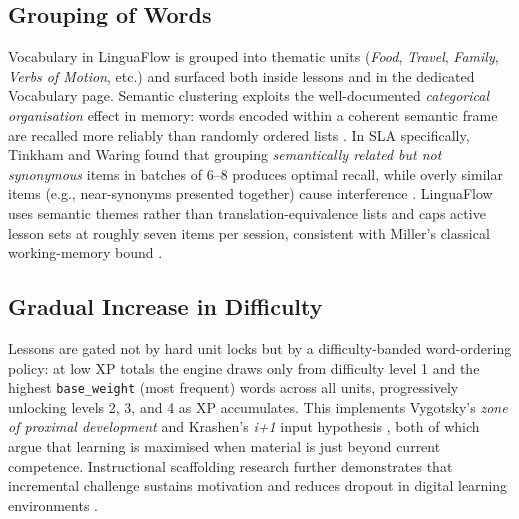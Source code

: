 \documentclass[11pt,a4paper]{article}
\begin{document}
\subsection{Grouping of Words}
Vocabulary in LinguaFlow is grouped into thematic units (\emph{Food}, \emph{Travel}, \emph{Family}, \emph{Verbs of Motion}, etc.) and surfaced both inside lessons and in the dedicated Vocabulary page. Semantic clustering exploits the well-documented \emph{categorical organisation} effect in memory: words encoded within a coherent semantic frame are recalled more reliably than randomly ordered lists \cite{bousfield1953occurrence,tulving1962subjective}. In SLA specifically, Tinkham and Waring found that grouping \emph{semantically related but not synonymous} items in batches of 6--8 produces optimal recall, while overly similar items (e.g., near-synonyms presented together) cause interference \cite{tinkham1997effects,waring1997negative}. LinguaFlow uses semantic themes rather than translation-equivalence lists and caps active lesson sets at roughly seven items per session, consistent with Miller's classical working-memory bound \cite{miller1956magical}.

\subsection{Gradual Increase in Difficulty}
Lessons are gated not by hard unit locks but by a difficulty-banded word-ordering policy: at low XP totals the engine draws only from difficulty level 1 and the highest \texttt{base\_weight} (most frequent) words across all units, progressively unlocking levels 2, 3, and 4 as XP accumulates. This implements Vygotsky's \emph{zone of proximal development} \cite{vygotsky1978mind} and Krashen's \emph{i+1} input hypothesis \cite{krashen1985input}, both of which argue that learning is maximised when material is just beyond current competence. Instructional scaffolding research further demonstrates that incremental challenge sustains motivation and reduces dropout in digital learning environments \cite{wood1976role,vanlehn2011relative}.
\end{document}
